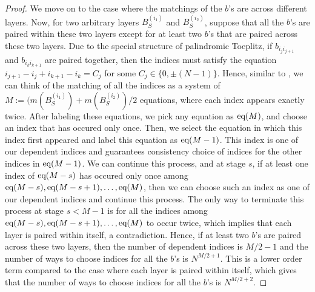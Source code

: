 \documentclass[11pt,reqno]{amsart}
\numberwithin{equation}{section}
\theoremstyle{plain}
\begin{document}
\begin{proof}
We move on to the case where the matchings of the $b$'s are across different layers. Now, for two arbitrary layers $B^{(i_1)}_S$ and $B^{(i_2)}_S$, suppose that all the $b$'s are paired within these two layers except for at least two $b$'s that are paired across these two layers. Due to the special structure of palindromic Toeplitz, if $b_{i_ji_{j+1}}$ and $b_{i_ki_{k+1}}$ are paired together, then the indices must satisfy the equation $i_{j+1}-i_j+i_{k+1}-i_k=C_j$ for some $C_j\in\{0, \pm (N-1)\}$. Hence, similar to \cite{palindromicToeplitz}, we can think of the matching of all the indices as a system of $M:=(m(B^{(i_1)}_S)+m(B^{(i_2)}_S)/2$ equations, where each index appears exactly twice. After labeling these equations, we pick any equation as $\textup{eq}(M)$, and choose an index that has occured only once. Then, we select the equation in which this index first appeared and label this equation as $\textup{eq}(M-1)$. This index is one of our dependent indices and guarantees consistency choice of indices for the other indices in $\textup{eq}(M-1)$. We can continue this process, and at stage $s$, if at least one index of $\textup{eq}(M-s)$ has occured only once among $\textup{eq}(M-s), \textup{eq}(M-s+1), \dots, \textup{eq}(M)$, then we can choose such an index as one of our dependent indices and continue this process. The only way to terminate this process at stage $s<M-1$ is for all the indices among $\textup{eq}(M-s), \textup{eq}(M-s+1), \dots, \textup{eq}(M)$ to occur twice, which implies that each layer is paired within itself, a contradiction. Hence, if at least two $b$'s are paired across these two layers, then the number of dependent indices is $M/2-1$ and the number of ways to choose indices for all the $b$'s is $N^{M/2+1}$. This is a lower order term compared to the case where each layer is paired within itself, which gives that the number of ways to choose indices for all the $b$'s is $N^{M/2+2}$.


\end{proof}
\end{document}
